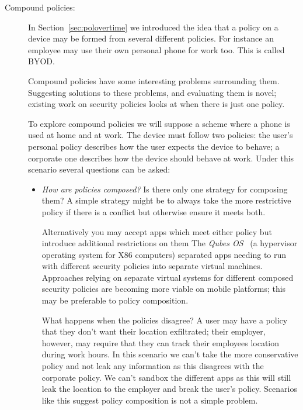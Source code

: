 \documentclass[a4paper]{article}
\begin{document}
\begin{description}
  \item[Compound policies:] In Section~\ref{sec:polovertime} we introduced the idea that a policy on a
    device may be formed from several different policies.  For instance an
    employee may use their own personal phone for work too.  This is called
    \ac{BYOD}.
    
    Compound policies have some interesting problems surrounding them.
    Suggesting solutions to these problems, and evaluating them is novel;
    existing work on security policies looks at when there is just one policy.

    To explore compound policies we will suppose a scheme where a phone is used
    at home and at work.  The device must follow two policies: the user's
    personal policy describes how the user expects the device to behave; a
    corporate one describes how the device should behave at work.  Under this
    scenario several questions can be asked:

    \begin{itemize}
    
      \item \emph{How are policies composed?}  Is there only one strategy for
        composing them?  A simple strategy might be to always take the more
        restrictive policy if there is a conflict but otherwise ensure it meets
        both.  
        
        Alternatively you may accept apps which meet either policy but
        introduce additional restrictions on them
        The \emph{Qubes OS}~\cite{Rutkowska:2010wr} (a hypervisor
        operating system for X86 computers) separated apps needing to run with
        different security policies into separate virtual machines.  Approaches
        relying on separate virtual systems for different composed security
        policies are becoming more viable on mobile platforms; this may be
        preferable to policy composition.

        What happens when the policies disagree?  A user may have a policy that
        they don't want their location exfiltrated; their employer, however, may
        require that they can track their employees location during work hours.  
        In this scenario we can't take the more conservative policy and not leak
        any information as this disagrees with the corporate policy.  We can't
        sandbox the different apps as this will still leak the location to the
        employer and break the user's policy.  Scenarios like this suggest
        policy composition is not a simple problem.


\end{itemize}
\end{description}
\end{document}
